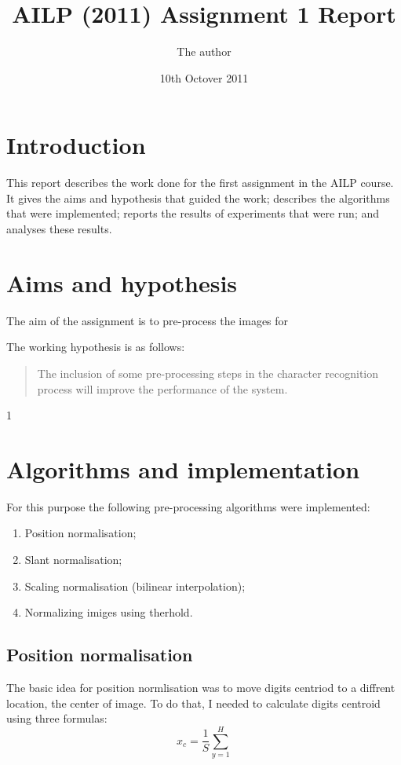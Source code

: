 \documentclass[10pt,a4paper,twocolumn]{article}
\title{AILP (2011) Assignment 1 Report}  %
\author{The author}                      %
\date{10th Octover 2011}                 %
\begin{document}
\maketitle  %
%
\section{Introduction}

This report describes the work done for the first assignment in the AILP
course.  It gives the aims and hypothesis that guided the work;
describes the algorithms that were implemented;  reports the results
of experiments that were run;  and analyses these results.

\section{Aims and hypothesis}

The aim of the assignment is to pre-process the images for

The working hypothesis is as follows:
\begin{quote}
  The inclusion of some pre-processing steps in the character recognition
  process will improve the performance of the system.
\end{quote}1


\section{Algorithms and implementation}

For this purpose the following pre-processing algorithms were implemented:
\begin{enumerate}
\item Position normalisation;
\item Slant normalisation;
\item Scaling normalisation (bilinear interpolation);
\item Normalizing imiges using therhold.
\end{enumerate}

\subsection{Position normalisation}

The basic idea for position normlisation was to move digits centriod to a diffrent location, the center of image. To do that, I needed to calculate digits centroid using three formulas:
\begin{equation}
x_c=\frac{1}{S} \sum_{y=1}^H
\label{eq1}
\end{equation}
\end{document}
